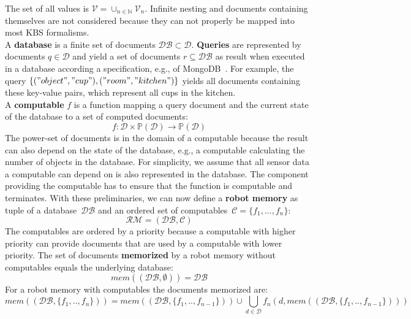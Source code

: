 The set of all values is $\mathcal{V}=\cup_{n\in\mathbb{N}}\mathcal{V}_n$.
  Infinite nesting and
documents containing themselves are not considered because they can
not properly be mapped into most KBS formalisms.
\\
A \textbf{database} is a finite set of documents $\mathcal{DB} \subset \mathcal{D}$.
\textbf{Queries} are represented by documents $q\in\mathcal{D}$ and
yield a set of documents $r\subseteq\mathcal{DB}$ as result when
executed in a database according a specification, e.g., of
MongoDB~\cite{mongodb}. For example, the query
$\{("object","cup"),("room","kitchen")\}$ yields all documents
containing these key-value pairs, which represent all cups in the
kitchen.
\\
A \textbf{computable} $f$ is a function mapping a query document and
the current state of the database to a set of computed documents:
$$f: \mathcal{D}\times\mathbb{P}(\mathcal{D}) \rightarrow \mathbb{P}(\mathcal{D})$$
The power-set of documents is in the domain of a computable because the
result can also depend on the state of the database, e.g., a computable
calculating the number of objects in the database. For simplicity, we
assume that all sensor data a computable can depend on is also
represented in the database. The component providing the computable
has to ensure that the function is computable and terminates.
%
With these preliminaries, we can now define a \textbf{robot memory} as tuple
of a database~$\mathcal{DB}$ and an ordered set of computables~$\mathcal{C}=\{f_1,...,f_n\}$:
$$\mathcal{RM}=(\mathcal{DB},\mathcal{C})$$
%
The computables are ordered by a priority because a computable with
higher priority can provide documents that are used by a computable
with lower priority. The set of documents \textbf{memorized} by a
robot memory without computables equals the underlying database:
$$mem(\mathcal{(DB,\emptyset)})=\mathcal{DB}$$
For a robot memory with computables the documents memorized are:
$$mem((\mathcal{DB},\{f_1,..,f_n\}))=mem((\mathcal{DB},\{f_1,..,f_{n-1}\})) \cup \bigcup_{d\in\mathcal{D}}f_n(d,mem((\mathcal{DB},\{f_1,..,f_{n-1}\})))$$

